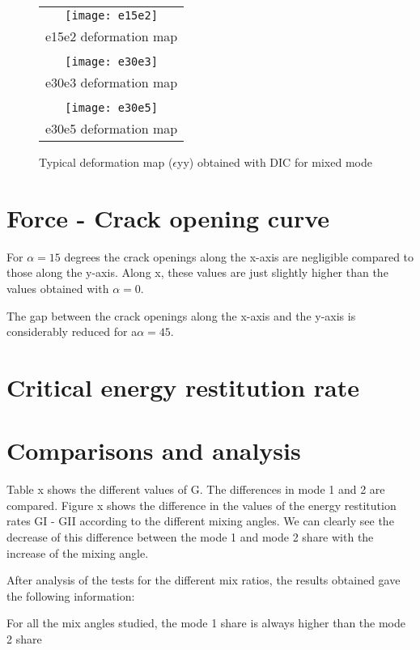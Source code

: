 \begin{figure}[htp]
	\centering
	\begin{tabular}{c}
		\texttt{[image: e15e2]} \\
		e15e2 deformation map \\
		\\
		\texttt{[image: e30e3]} \\
		e30e3 deformation map \\
		\\
		\texttt{[image: e30e5]} \\
		e30e5 deformation map \\
	\end{tabular}
	\caption{Typical deformation map ($\epsilon$yy) obtained with DIC for mixed mode}
	\label{fig:Strain_def_mixedmode}
\end{figure}

\section{Force - Crack opening curve}

For $\alpha=15$ degrees the crack openings along the x-axis are negligible compared to those along the y-axis. Along x, these values are just slightly higher than the values obtained with $\alpha=0$.

The gap between the crack openings along the x-axis and the y-axis is considerably reduced for a$\alpha=45$.

\section{Critical energy restitution rate}

\section{Comparisons and analysis}

Table x shows the different values of G. The differences in mode 1 and 2 are compared.
Figure x shows the difference in the values of the energy restitution rates GI - GII according to the different mixing angles. We can clearly see the decrease of this difference between the mode 1 and mode 2 share with the increase of the mixing angle.

After analysis of the tests for the different mix ratios, the results obtained gave the following information:

For all the mix angles studied, the mode 1 share is always higher than the mode 2 share

